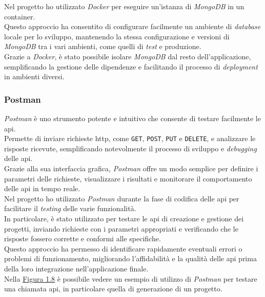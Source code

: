 \noindent Nel progetto ho utilizzato \textit{Docker} per eseguire un'istanza di \textit{MongoDB} in un \gls{container}.\\
Questo approccio ha consentito di configurare facilmente un ambiente di \textit{database} locale per lo sviluppo, mantenendo la stessa configurazione e versioni di \textit{MongoDB} tra i vari ambienti, come quelli di \textit{test} e produzione.\\
Grazie a \textit{Docker}, è stato possibile isolare \textit{MongoDB} dal resto dell'applicazione, semplificando la gestione delle dipendenze e facilitando il processo di \textit{deployment} in ambienti diversi.

\subsubsection{Postman}

\textit{Postman} è uno strumento potente e intuitivo che consente di testare facilmente le \gls{api}.\\
Permette di inviare richieste \gls{http}, come \texttt{GET}, \texttt{POST}, \texttt{PUT} e \texttt{DELETE}, e analizzare le risposte ricevute, semplificando notevolmente il processo di sviluppo e \textit{debugging} delle \gls{api}.\\
Grazie alla sua interfaccia grafica, \textit{Postman} offre un modo semplice per definire i parametri delle richieste, visualizzare i risultati e monitorare il comportamento delle \gls{api} in tempo reale.\\

\noindent Nel progetto ho utilizzato \textit{Postman} durante la fase di codifica delle \gls{api} per facilitare il \textit{testing} delle varie funzionalità.\\
In particolare, è stato utilizzato per testare le \gls{api} di creazione e gestione dei progetti, inviando richieste con i parametri appropriati e verificando che le risposte fossero corrette e conformi alle specifiche.\\ 
Questo approccio ha permesso di identificare rapidamente eventuali errori o problemi di funzionamento, migliorando l'affidabilità e la qualità delle \gls{api} prima della loro integrazione nell'applicazione finale.\\

\noindent Nella {\hyperref[fig:postman]{Figura 1.8}} è possibile vedere un esempio di utilizzo di \textit{Postman} per testare una chiamata \gls{api}, in particolare quella di generazione di un progetto.

